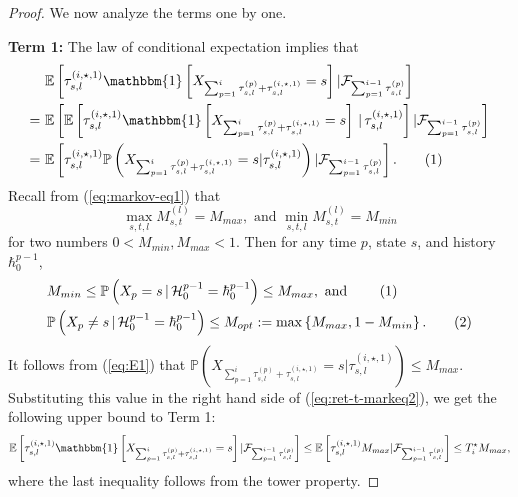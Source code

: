 \documentclass[twoside,11pt]{article}
\newcommand{\pow}[1]{^{(#1)}}%
\numberwithin{equation}{section}
\newcommand{\lp}{\left(}
\newcommand{\rp}{\right)}
\newcommand{\lc}{\left\{}
\newcommand{\rc}{\right\}}
\newcommand{\lb}{\left[}
\newcommand{\rb}{\right]}
\newcommand{\History}{\mathcal{H}}
\newcommand{\history}{\hbar}
\newcommand{\Pbb}{\mathbb{P}}
\newcommand{\Fcal}{\mathcal{F}}
\newcommand\numberthis{\addtocounter{equation}{1}\tag{\theequation}}
\newcommand{\prob}{\Pbb}
\newcommand{\expec}{\mathbb{E}}
\newcommand{\indicator}{\mathbbm{1}}
\newcommand{\gn}{\, | \,}
\begin{document}
\begin{proof}
We now analyze the terms one by one. 

\noindent\textbf{Term 1: } The law of conditional expectation implies that
\begin{align*}
    & \expec\lb\tau_{s,l}\pow{i,\star,1}\indicator\lb X_{\sum_{p=1}^i \tau_{s,l}\pow{p}+ \tau_{s,l}\pow{i,\star,1}}=s\rb|\Fcal_{\sum_{p=1}^{i-1} \tau_{s,l}\pow{p}}\rb \\
     = \ & \expec\lb \expec\lb\tau_{s,l}\pow{i,\star,1}\indicator\lb X_{\sum_{p=1}^i \tau_{s,l}\pow{p}+ \tau_{s,l}\pow{i,\star,1}}=s\rb\gn\tau_{s,l}\pow{i,\star,1} \rb|\Fcal_{\sum_{p=1}^{i-1} \tau_{s,l}\pow{p}} \rb\\
    = \ & \expec\lb\tau_{s,l}\pow{i,\star,1}\prob\lp X_{\sum_{p=1}^i \tau_{s,l}\pow{p}+ \tau_{s,l}\pow{i,\star,1}}=s| \tau_{s,l}\pow{i,\star,1} \rp|\Fcal_{\sum_{p=1}^{i-1} \tau_{s,l}\pow{p}}\rb. \numberthis\label{eq:ret-t-markeq2}
\end{align*}
Recall from (\ref{eq:markov-eq1}) that 
\[
 \max_{s,t,l} M_{s,t}^{(l)}=M_{max}, \text{ and } \min_{s,t,l} M_{s,t}^{(l)}=M_{min}
\]
for two numbers $0<M_{min},M_{max}<1$. 
Then for any time $p$, state $s$, and history $\history_0^{p-1}$,
\begin{align*}
    &M_{min}\leq \prob\lp X_p=s\gn \History_0^{p-1}=\history_0^{p-1}\rp\leq M_{max}, \, \, \text{and } \numberthis \label{eq:E1}\\
    & \prob\lp X_p\neq s\gn \History_0^{p-1}=\history_0^{p-1}\rp\leq M_{opt} := \max\lc  M_{max},1-M_{min}\rc. \numberthis \label{eq:E2}
\end{align*}
It follows from (\ref{eq:E1}) that $\prob\lp X_{\sum_{p=1}^i \tau_{s,l}\pow{p}+ \tau_{s,l}\pow{i,\star,1}}=s| \tau_{s,l}\pow{i,\star,1} \rp\leq M_{max}$. 
Substituting this value in the right hand side of (\ref{eq:ret-t-markeq2}), we get the following upper bound to Term 1:
\[
 \expec\lb\tau_{s,l}\pow{i,\star,1}\indicator\lb X_{\sum_{p=1}^i \tau_{s,l}\pow{p}+ \tau_{s,l}\pow{i,\star,1}}=s\rb|\Fcal_{\sum_{p=1}^{i-1} \tau_{s,l}\pow{p}}\rb\leq \expec\lb \tau_{s,l}\pow{i,\star,1}M_{max}|\Fcal_{\sum_{p=1}^{i-1} \tau_{s,l}\pow{p}}\rb\leq T^\star_i M_{max},
\]
where the last inequality follows from the tower property.


\end{proof}
\end{document}
